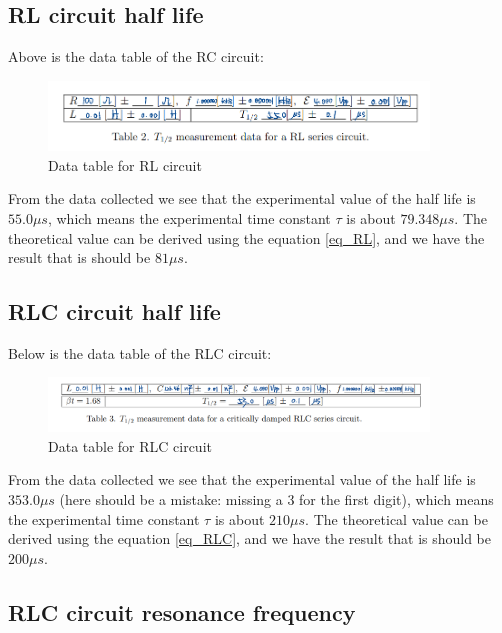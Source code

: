 \documentclass[12pt, a4paper, oneside]{article}
\begin{document}
\subsection{RL circuit half life}
\indent

Above is the data table of the RC circuit:
\begin{figure}[htbp]
	\centering
	\includegraphics[width=0.9\textwidth]{C2.png}
	\caption{Data table for RL circuit}
\end{figure}

From the data collected we see that the experimental value of the half life is $55.0\mu s$, which means the experimental time constant
$\tau$ is about $79.348\mu s$. The theoretical value can be derived using the equation \ref{eq_RL}, and we have the result that is should
be $81\mu s$. 

\subsection{RLC circuit half life}
\indent

Below is the data table of the RLC circuit:
\begin{figure}[htbp]
	\centering
	\includegraphics[width=0.9\textwidth]{C3.png}
	\caption{Data table for RLC circuit}
\end{figure}

From the data collected we see that the experimental value of the half life is $353.0\mu s$ (here should be 
a mistake: missing a 3 for the first digit), which means the experimental time constant
$\tau$ is about $210\mu s$. The theoretical value can be derived using the equation \ref{eq_RLC}, and we have the result that is should
be $200\mu s$. 

\subsection{RLC circuit resonance frequency}
\indent
\end{document}
